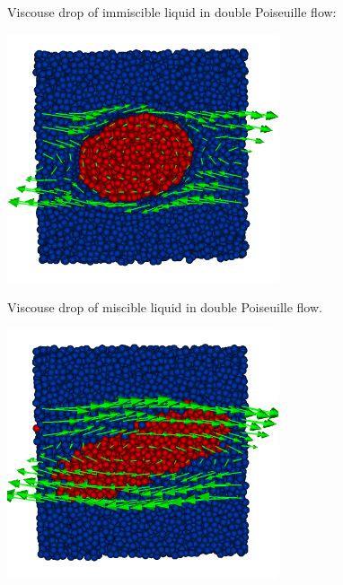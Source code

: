 Viscouse drop of immiscible liquid in double Poiseuille flow:
\begin{center}
\includegraphics[width=0.6\textwidth]{i/drop/a/visit.png}
\end{center}

Viscouse drop of miscible liquid in double Poiseuille flow.
\begin{center}
\includegraphics[width=0.6\textwidth]{i/drop/b/visit.png}
\end{center}
